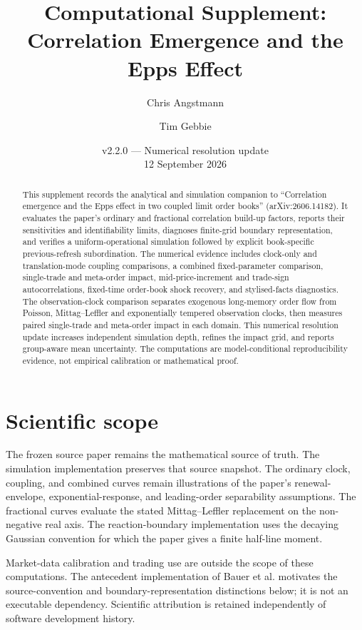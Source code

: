 \documentclass[11pt]{article}
\title{Computational Supplement:\\Correlation Emergence and the Epps Effect}
\author{Chris Angstmann \and Tim Gebbie}
\date{v2.2.0 --- Numerical resolution update\\12 September 2026}
\begin{document}
\maketitle

\begin{abstract}
This supplement records the analytical and simulation companion to ``Correlation emergence and the Epps effect in two coupled limit order books'' (arXiv:2606.14182). It evaluates the paper's ordinary and fractional correlation build-up factors, reports their sensitivities and identifiability limits, diagnoses finite-grid boundary representation, and verifies a uniform-operational simulation followed by explicit book-specific previous-refresh subordination. The numerical evidence includes clock-only and translation-mode coupling comparisons, a combined fixed-parameter comparison, single-trade and meta-order impact, mid-price-increment and trade-sign autocorrelations, fixed-time order-book shock recovery, and stylised-facts diagnostics. The observation-clock comparison separates exogenous long-memory order flow from Poisson, Mittag--Leffler and exponentially tempered observation clocks, then measures paired single-trade and meta-order impact in each domain. This numerical resolution update increases independent simulation depth, refines the impact grid, and reports group-aware mean uncertainty. The computations are model-conditional reproducibility evidence, not empirical calibration or mathematical proof.
\end{abstract}

\tableofcontents

\section{Scientific scope}

The frozen source paper remains the mathematical source of truth. The simulation implementation preserves that source snapshot. The ordinary clock, coupling, and combined curves remain illustrations of the paper's renewal-envelope, exponential-response, and leading-order separability assumptions. The fractional curves evaluate the stated Mittag--Leffler replacement on the non-negative real axis. The reaction-boundary implementation uses the decaying Gaussian convention for which the paper gives a finite half-line moment.

Market-data calibration and trading use are outside the scope of these computations. The antecedent implementation of Bauer et al. motivates the source-convention and boundary-representation distinctions below; it is not an executable dependency. Scientific attribution is retained independently of software development history.
\end{document}
